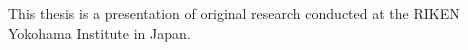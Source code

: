 This thesis is a presentation of original research conducted at the RIKEN Yokohama Institute in Japan.
